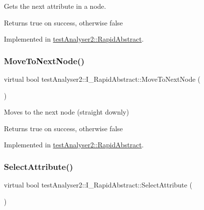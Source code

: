 Gets the next attribute in a node. 

\begin{DoxyReturn}{Returns}
true on success, otherwise false 
\end{DoxyReturn}


Implemented in \mbox{\hyperlink{classtestAnalyser2_1_1RapidAbstract_a406f500d326f20c768abffb9e6318616}{test\+Analyser2\+::\+Rapid\+Abstract}}.

\mbox{\label{classtestAnalyser2_1_1I__RapidAbstract_a95d6bb9f515adb49e62396e48d23d88f}} 
\subsubsection{\texorpdfstring{MoveToNextNode()}{MoveToNextNode()}}
{\footnotesize\ttfamily virtual bool test\+Analyser2\+::\+I\+\_\+\+Rapid\+Abstract\+::\+Move\+To\+Next\+Node (\begin{DoxyParamCaption}{ }\end{DoxyParamCaption})\hspace{0.3cm}{\ttfamily [pure virtual]}}



Moves to the next node (straight downly) 

\begin{DoxyReturn}{Returns}
true on success, otherwise false 
\end{DoxyReturn}


Implemented in \mbox{\hyperlink{classtestAnalyser2_1_1RapidAbstract_a49c72b683d3c31e7aca432de5d97711c}{test\+Analyser2\+::\+Rapid\+Abstract}}.

\mbox{\label{classtestAnalyser2_1_1I__RapidAbstract_a916b023a5b55e1334f6595ed9d4cb7d8}} 
\subsubsection{\texorpdfstring{SelectAttribute()}{SelectAttribute()}}
{\footnotesize\ttfamily virtual bool test\+Analyser2\+::\+I\+\_\+\+Rapid\+Abstract\+::\+Select\+Attribute (\begin{DoxyParamCaption}{ }\end{DoxyParamCaption})\hspace{0.3cm}{\ttfamily [pure virtual]}}



